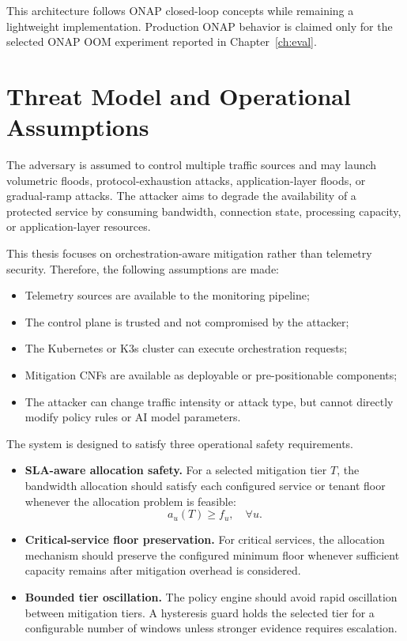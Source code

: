 \documentclass[12pt, a4paper, reqno, oneside]{book}
\begin{document}
This architecture follows ONAP closed-loop concepts while remaining a
lightweight implementation. Production ONAP behavior is claimed only for the
selected ONAP OOM experiment reported in Chapter~\ref{ch:eval}.

\section{Threat Model and Operational Assumptions}
\label{sec:threat-model}

The adversary is assumed to control multiple traffic sources and may launch
volumetric floods, protocol-exhaustion attacks, application-layer floods, or
gradual-ramp attacks. The attacker aims to degrade the availability of a
protected service by consuming bandwidth, connection state, processing
capacity, or application-layer resources.

This thesis focuses on orchestration-aware mitigation rather than telemetry
security. Therefore, the following assumptions are made:

\begin{itemize}
    \item Telemetry sources are available to the monitoring pipeline;
    \item The control plane is trusted and not compromised by the attacker;
    \item The Kubernetes or K3s cluster can execute orchestration requests;
    \item Mitigation CNFs are available as deployable or pre-positionable
    components;
    \item The attacker can change traffic intensity or attack type, but cannot
    directly modify policy rules or AI model parameters.
\end{itemize}

The system is designed to satisfy three operational safety requirements.

\begin{itemize}
    \item \textbf{SLA-aware allocation safety.}
    For a selected mitigation tier \(T\), the bandwidth allocation should
    satisfy each configured service or tenant floor whenever the allocation
    problem is feasible:
    \[
        a_u(T) \geq f_u, \quad \forall u.
    \]

    \item \textbf{Critical-service floor preservation.}
    For critical services, the allocation mechanism should preserve the
    configured minimum floor whenever sufficient capacity remains after
    mitigation overhead is considered.

    \item \textbf{Bounded tier oscillation.}
    The policy engine should avoid rapid oscillation between mitigation tiers.
    A hysteresis guard holds the selected tier for a configurable number of
    windows unless stronger evidence requires escalation.
\end{itemize}
\end{document}
